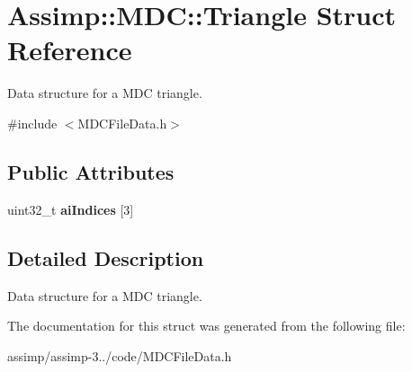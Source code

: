 \hypertarget{struct_assimp_1_1_m_d_c_1_1_triangle}{\section{Assimp\+:\+:M\+D\+C\+:\+:Triangle Struct Reference}
\label{struct_assimp_1_1_m_d_c_1_1_triangle}
}


Data structure for a M\+D\+C triangle.  




{\ttfamily \#include $<$M\+D\+C\+File\+Data.\+h$>$}

\subsection*{Public Attributes}
\begin{DoxyCompactItemize}
\item 
\hypertarget{struct_assimp_1_1_m_d_c_1_1_triangle_a8db0c446cf03ba3e4be091b50282af37}{uint32\+\_\+t {\bfseries ai\+Indices} \mbox{[}3\mbox{]}}\label{struct_assimp_1_1_m_d_c_1_1_triangle_a8db0c446cf03ba3e4be091b50282af37}

\end{DoxyCompactItemize}


\subsection{Detailed Description}
Data structure for a M\+D\+C triangle. 

The documentation for this struct was generated from the following file\+:\begin{DoxyCompactItemize}
\item 
assimp/assimp-\/3../code/M\+D\+C\+File\+Data.\+h\end{DoxyCompactItemize}
